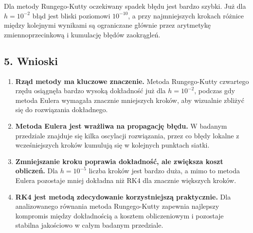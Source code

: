 \documentclass[12pt,a4paper]{article}
\begin{document}
Dla metody Rungego-Kutty oczekiwany spadek błędu jest bardzo szybki. Już dla $h=10^{-2}$ błąd jest bliski poziomowi $10^{-10}$, a przy najmniejszych krokach różnice między kolejnymi wynikami są ograniczane głównie przez arytmetykę zmiennoprzecinkową i kumulację błędów zaokrągleń.

\subsection*{5. Wnioski}

\begin{enumerate}
    \item \textbf{Rząd metody ma kluczowe znaczenie.} Metoda Rungego-Kutty czwartego rzędu osiągnęła bardzo wysoką dokładność już dla $h=10^{-2}$, podczas gdy metoda Eulera wymagała znacznie mniejszych kroków, aby wizualnie zbliżyć się do rozwiązania dokładnego.
    \item \textbf{Metoda Eulera jest wrażliwa na propagację błędu.} W badanym przedziale znajduje się kilka oscylacji rozwiązania, przez co błędy lokalne z wcześniejszych kroków kumulują się w kolejnych punktach siatki.
    \item \textbf{Zmniejszanie kroku poprawia dokładność, ale zwiększa koszt obliczeń.} Dla $h=10^{-5}$ liczba kroków jest bardzo duża, a mimo to metoda Eulera pozostaje mniej dokładna niż RK4 dla znacznie większych kroków.
    \item \textbf{RK4 jest metodą zdecydowanie korzystniejszą praktycznie.} Dla analizowanego równania metoda Rungego-Kutty zapewnia najlepszy kompromis między dokładnością a kosztem obliczeniowym i pozostaje stabilna jakościowo w całym badanym przedziale.
\end{enumerate}
\end{document}

